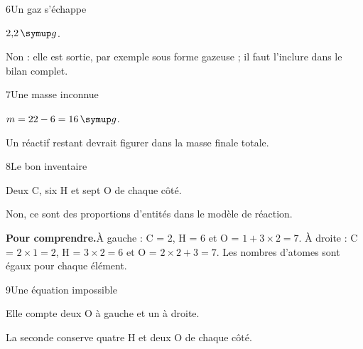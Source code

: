 \par\noindent\begin{minipage}{\linewidth}
\begin{corrige}{6}{Un gaz s’échappe}
\begin{questions}
\item $2{,}2\unite g$.
\item Non : elle est sortie, par exemple sous forme gazeuse ; il faut l’inclure dans le bilan complet.
\end{questions}
\end{corrige}
\end{minipage}
\par\noindent\begin{minipage}{\linewidth}
\begin{corrige}{7}{Une masse inconnue}
\begin{questions}
\item $m=22-6=16\unite g$.
\item Un réactif restant devrait figurer dans la masse finale totale.
\end{questions}
\end{corrige}
\end{minipage}
\par\noindent\begin{minipage}{\linewidth}
\begin{corrige}{8}{Le bon inventaire}
\begin{questions}
\item Deux C, six H et sept O de chaque côté.
\item Non, ce sont des proportions d’entités dans le modèle de réaction.
\end{questions}
\par\smallskip\noindent\textbf{Pour comprendre.}\enspace À gauche : C = 2, H = 6 et O = $1+3\times2=7$. À droite : C = $2\times1=2$, H = $3\times2=6$ et O = $2\times2+3=7$. Les nombres d’atomes sont égaux pour chaque élément.\par
{}
\end{corrige}
\end{minipage}
\par\noindent\begin{minipage}{\linewidth}
\begin{corrige}{9}{Une équation impossible}
\begin{questions}
\item Elle compte deux O à gauche et un à droite.
\item La seconde conserve quatre H et deux O de chaque côté.
\end{questions}
\end{corrige}
\end{minipage}
